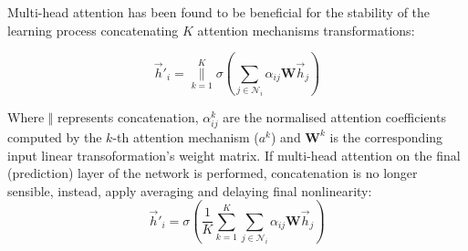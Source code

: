 \documentclass{article}
\begin{document}
Multi-head attention has been found to be beneficial for the stability of the
learning process concatenating $K$  attention mechanisms transformations:

\begin{equation}
  \vec{h}'_i =  \underset{k=1}{\overset{K}{\Big\|}} \sigma\left( \sum_{j \in
  \mathcal{N}_i} \alpha_{ij} \mathbf{W}\vec{h}_j \right)
  \label{eq:4}
\end{equation}

Where $\Vert$ represents concatenation, $\alpha_{ij}^{k}$ are the normalised attention coefficients computed
by the $k$-th attention mechanism ($a^k$) and $\mathbf{W}^k$ is the corresponding input linear transoformation's 
weight matrix.
If multi-head attention on the final (prediction) layer of the network is performed, concatenation is no longer
sensible, instead, apply averaging and delaying final nonlinearity:
\begin{equation}
  \vec{h}'_i =  \sigma\left(\frac{1}{K} \sum_{k=1}^{K} \sum_{j \in
  \mathcal{N}_i} \alpha_{ij} \mathbf{W}\vec{h}_j \right)
  \label{eq:5}
\end{equation}
\end{document}
